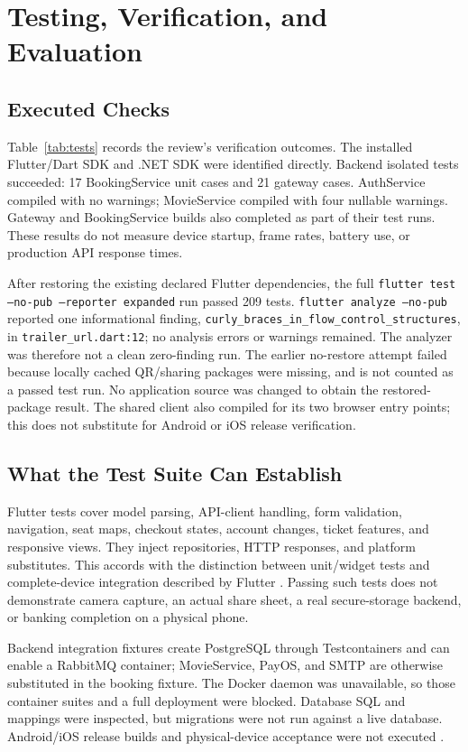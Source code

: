 \documentclass[conference]{IEEEtran}
\newcommand{\code}[1]{\texttt{#1}}
\begin{document}
\section{Testing, Verification, and Evaluation}
\subsection{Executed Checks}
Table~\ref{tab:tests} records the review's verification outcomes. The installed
Flutter/Dart SDK and .NET SDK were identified directly. Backend isolated
tests succeeded: 17 BookingService unit cases and 21 gateway cases. AuthService
compiled with no warnings; MovieService compiled with four nullable warnings.
Gateway and BookingService builds also completed as part of their test runs.
These results do not measure device startup, frame rates, battery use, or
production API response times.


After restoring the existing declared Flutter dependencies, the full
\code{flutter test --no-pub --reporter expanded} run passed 209 tests.
\code{flutter analyze --no-pub} reported one informational finding,
\code{curly\_braces\_in\_flow\_control\_structures}, in
\code{trailer\_url.dart:12}; no analysis errors or warnings remained.
The analyzer was therefore not a clean zero-finding run. The earlier
no-restore attempt failed because locally cached QR/sharing packages were
missing, and is not counted as a passed test run. No application source
was changed to obtain the restored-package result.
The shared client also compiled for its two browser entry points;
this does not substitute for Android or iOS release verification.



\subsection{What the Test Suite Can Establish}
Flutter tests cover model parsing, API-client handling, form validation,
navigation, seat maps, checkout states, account changes, ticket features,
and responsive views. They inject repositories, HTTP responses, and platform
substitutes. This accords with the distinction between unit/widget tests and
complete-device integration described by Flutter \cite{fluttertest,tests}.
Passing such tests does not demonstrate camera capture, an actual share sheet,
a real secure-storage backend, or banking completion on a physical phone.

Backend integration fixtures create PostgreSQL through Testcontainers and
can enable a RabbitMQ container; MovieService, PayOS, and SMTP are otherwise
substituted in the booking fixture. The Docker daemon was unavailable, so
those container suites and a full deployment were blocked. Database SQL and
mappings were inspected, but migrations were not run against a live database.
Android/iOS release builds and physical-device acceptance were not executed
\cite{tests,db}.
\end{document}
